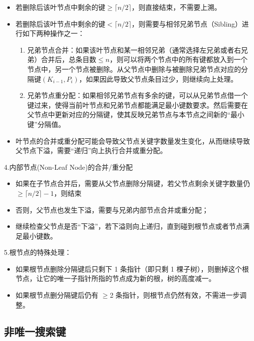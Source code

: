 \begin{itemize}
    \item 若删除后该叶节点中剩余的键$\geq \lceil n/2 \rceil$，则直接结束，不需要上溯。
    \item 若删除后该叶节点中剩余的键$< \lceil n/2 \rceil$，则需要与相邻兄弟节点（Sibling）进行如下两种操作之一：
       \begin{enumerate}
          \item 兄弟节点合并：如果该叶节点和某一相邻兄弟（通常选择左兄弟或者右兄弟）合并后，总条目数$\leq n$，则可以将两个节点中的所有键都放入到一个节点中，另一个节点被删除。从父节点中删除与被删除兄弟节点对应的分隔键$(K_{i-1},P_i)$，如果因此导致父节点条目过少，则继续向上处理。
          \item 兄弟节点重分配：如果相邻兄弟节点有多余的键，可以从兄弟节点借一个键过来，使得当前叶节点和兄弟节点都能满足最小键数要求。然后需要在父节点中更新对应的分隔键，使其反映兄弟节点与本节点之间新的“最小键”分隔值。
       \end{enumerate}
    \item 叶节点的合并或重分配可能会导致父节点关键字数量发生变化，从而继续导致父节点下溢，需要“递归”向上执行合并或重分配。
\end{itemize}

4.内部节点(Non-Leaf Node)的合并/重分配

\begin{itemize}
    \item 如果在子节点合并后，需要从父节点删除分隔键，若父节点剩余关键字数量仍$\geq \lceil n/2 \rceil -1$，则结束
    \item 否则，父节点也发生下溢，需要与兄弟内部节点合并或重分配；
    \item 继续检查父节点是否“下溢”，若下溢则向上递归，直到碰到根节点或者节点满足最小键数。
\end{itemize}

5.根节点的特殊处理：

\begin{itemize}
    \item 如果根节点删除分隔键后只剩下 1 条指针（即只剩 1 棵子树），则删掉这个根节点，让它的唯一子指针所指的节点成为新的根，树的高度减一。
    \item 如果根节点删分隔键后仍有 $\geq$2 条指针，则根节点仍然有效，不需进一步调整。
\end{itemize}

\subsection{非唯一搜索键}

